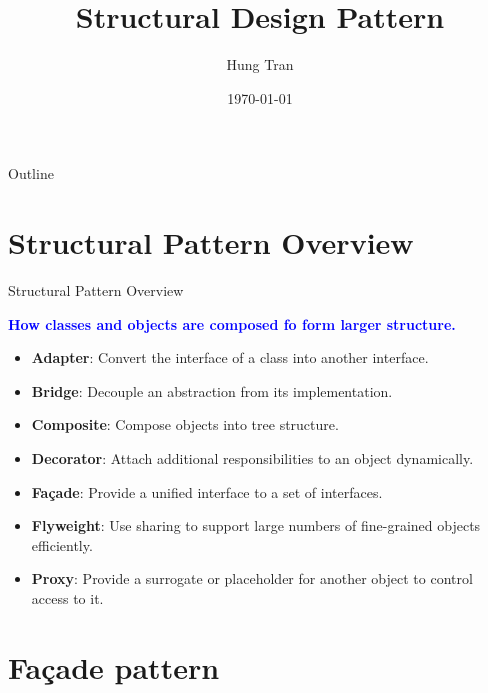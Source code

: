 \documentclass[13pt]{beamer}
\title[Design Pattern]{Structural Design Pattern}
\author{Hung Tran}
\institute{Fpt software}
\date{\today}
\begin{document}
\begin{frame}
\titlepage
\end{frame}

\begin{frame}{Outline}
\tableofcontents
\end{frame}

\section{Structural Pattern Overview}

\begin{frame}{Structural Pattern Overview}
	\begin{center}
	\textcolor{blue}{\textbf{How classes and objects are composed fo form larger structure.}}
	\end{center}
	\begin{itemize}
		\item \textbf{Adapter}: Convert the interface of a class into another interface.
		\item \textbf{Bridge}: Decouple an abstraction from its implementation.
		\item \textbf{Composite}: Compose objects into tree structure.
		\item \textbf{Decorator}: Attach additional responsibilities to an object dynamically.
		\item \textbf{Façade}: Provide a unified interface to a set of interfaces.
		\item \textbf{Flyweight}: Use sharing to support large numbers of fine-grained objects efficiently.
		\item \textbf{Proxy}: Provide a surrogate or placeholder for another object to control access to it.
	\end{itemize}
\end{frame}

\section{Façade pattern}
\end{document}
